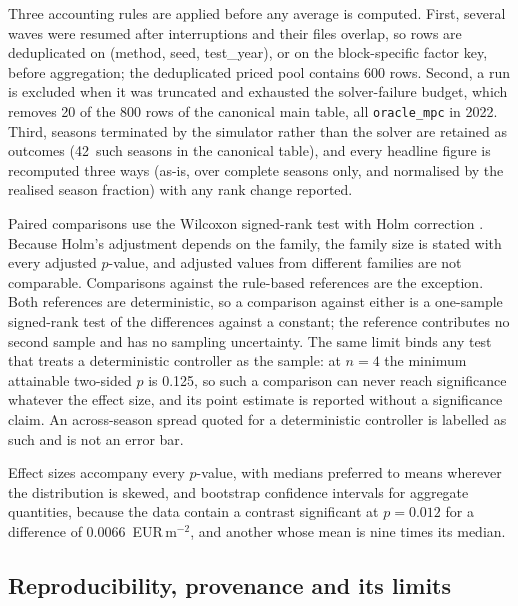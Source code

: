 Three accounting rules are applied before any average is computed. First, several waves
were resumed after
interruptions and their files overlap, so rows are deduplicated on
(method, seed, test\_year), or on the block-specific factor key, before
aggregation; the deduplicated priced pool contains 600 rows. Second, a run is excluded
when it was truncated and exhausted the solver-failure budget, which removes 20 of
the 800 rows of the canonical main table, all \texttt{oracle\_mpc} in 2022. Third,
seasons terminated by the simulator rather than the solver are retained as outcomes
(42~such seasons in the canonical table), and every headline figure is recomputed three
ways (as-is, over complete seasons only, and normalised by the realised season fraction) with any rank change reported.

Paired comparisons use the Wilcoxon signed-rank test \cite{wilcoxon1945} with Holm
correction \cite{holm1979}. Because Holm's adjustment depends on the family, the family
size is stated with every adjusted $p$-value, and adjusted values from different families
are not comparable. Comparisons against the rule-based references are the exception. Both
references are deterministic, so a comparison against either is a one-sample signed-rank
test of the differences against a constant; the reference contributes no second sample
and has no sampling uncertainty. The same limit binds any
test that treats a deterministic controller as the sample: at $n=4$ the minimum attainable
two-sided $p$ is 0.125, so such a comparison can never reach significance whatever the
effect size, and its point estimate is reported without a significance claim. An
across-season spread quoted for a deterministic controller is labelled as such and is not
an error bar.

Effect sizes accompany every $p$-value, with medians preferred to means wherever the
distribution is skewed, and bootstrap confidence intervals \cite{efron1994,demsar2006}
for aggregate quantities, because the data contain a contrast significant at
$p=0.012$ for a difference of 0.0066~EUR\,m$^{-2}$, and another whose mean is nine times its
median.

\subsection{Reproducibility, provenance and its limits}
\label{sec:repro}

